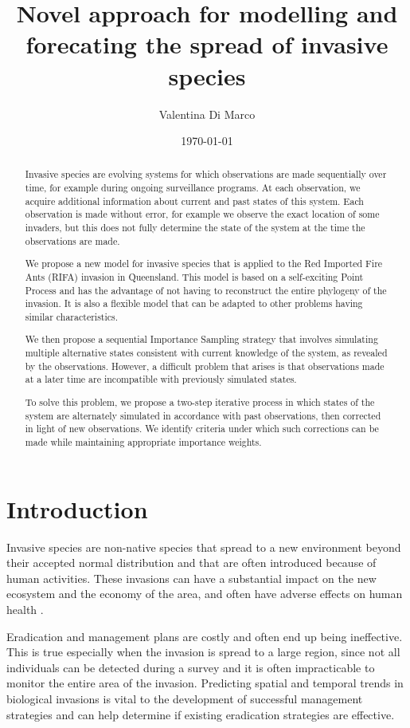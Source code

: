 \documentclass[11pt,a4paper]{article}
\title{Novel approach for modelling and forecating the spread of invasive species}
\author{Valentina Di Marco}
\date{\today}
\begin{document}
 \maketitle



\begin{abstract}
Invasive species are evolving systems for which observations are made sequentially over time, for example during ongoing surveillance programs. At each observation, we acquire additional information about current and past states of this system. Each observation is made without error, for example we observe the exact location of some invaders, but this does not fully determine the state of the system at the time the observations are made.

We propose a new model for invasive species that is applied to the Red Imported Fire Ants (RIFA) invasion in Queensland. This model is based on a self-exciting Point Process and has the advantage of not having to reconstruct the entire phylogeny of the invasion. It is also a flexible model that can be adapted to other problems having similar characteristics.

We then propose a sequential Importance Sampling strategy that involves simulating multiple alternative states consistent with current knowledge of the system, as revealed by the observations. However, a difficult problem that arises is that observations made at a later time are incompatible with previously simulated states.

To solve this problem, we propose a two-step iterative process in which states of the system are alternately simulated in accordance with past observations, then corrected in light of new observations. We identify criteria under which such corrections can be made while maintaining appropriate importance weights.
\end{abstract}


\section{Introduction}

Invasive species are non-native species that spread to a new environment beyond their accepted normal distribution and that are often introduced because of human activities. These invasions can have a substantial impact on the new ecosystem and the economy of the area, and often have adverse effects on human health \cite{Mack}. 

Eradication and management plans are costly and often end up being ineffective. This is true especially when the invasion is spread to a large region, since not all individuals can be detected during a survey and it is often impracticable to monitor the entire area of the invasion. Predicting spatial and temporal trends in biological invasions is vital to the development of successful management strategies and can help determine if existing eradication strategies are effective.
\end{document}
